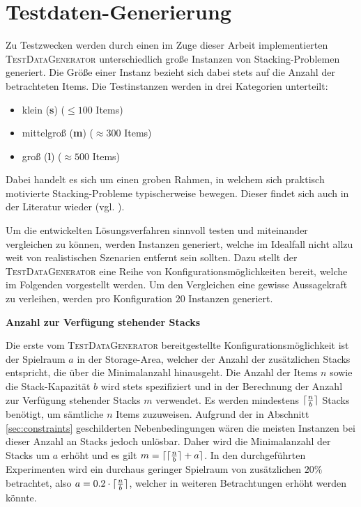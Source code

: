 \section{Testdaten-Generierung}
\label{sec:test_data}

Zu Testzwecken werden durch einen im Zuge dieser Arbeit implementierten \textsc{TestDataGenerator}
unterschiedlich große Instanzen von Stacking-Problemen generiert. Die Größe einer
Instanz bezieht sich dabei stets auf die Anzahl der betrachteten Items. Die Testinstanzen werden
in drei Kategorien unterteilt:
\begin{itemize}
  \item klein (\textbf{s}) ($\leq 100$ Items)
  \item mittelgroß (\textbf{m}) ($\approx 300$ Items)
  \item groß (\textbf{l}) ($\approx 500$ Items)\newline
\end{itemize}
Dabei handelt es sich um einen groben Rahmen, in welchem sich praktisch motivierte Stacking-Probleme
typischerweise bewegen. Dieser findet sich auch in der Literatur wieder (vgl. \citet{Le2016}).

Um die entwickelten Lösungsverfahren sinnvoll testen und miteinander vergleichen zu können,
werden Instanzen generiert, welche im Idealfall nicht allzu weit von realistischen Szenarien entfernt
sein sollten. Dazu stellt der \textsc{TestDataGenerator} eine Reihe von Konfigurationsmöglichkeiten
bereit, welche im Folgenden vorgestellt werden. Um den Vergleichen eine gewisse Aussagekraft zu verleihen,
werden pro Konfiguration $20$ Instanzen generiert.

\textbf{Anzahl zur Verfügung stehender Stacks}

Die erste vom \textsc{TestDataGenerator} bereitgestellte Konfigurationsmöglichkeit ist der Spielraum $a$ in der Storage-Area, welcher der Anzahl der zusätzlichen Stacks entspricht, die über die Minimalanzahl hinausgeht.
Die Anzahl der Items $n$ sowie die Stack-Kapazität $b$ wird stets spezifiziert und in der Berechnung der Anzahl zur Verfügung stehender Stacks $m$ verwendet. Es werden mindestens $\lceil\frac{n}{b}\rceil$ Stacks benötigt, um sämtliche $n$ Items zuzuweisen.
Aufgrund der in Abschnitt \ref{sec:constraints} geschilderten Nebenbedingungen wären die meisten Instanzen bei dieser
Anzahl an Stacks jedoch unlösbar. Daher wird die Minimalanzahl der Stacks um $a$ erhöht und es gilt
$m = \lceil\lceil\frac{n}{b}\rceil + a\rceil$. In den durchgeführten Experimenten wird ein durchaus geringer Spielraum von
zusätzlichen $20 \%$ betrachtet, also $a = 0.2 \cdot \lceil\frac{n}{b}\rceil$, welcher in weiteren Betrachtungen erhöht werden könnte.

